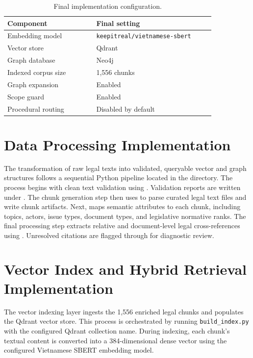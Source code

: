 \begin{table}[H]
  \centering
  \caption{Final implementation configuration.}
  \label{tab:implementation-configuration}
  \begin{tabular}{p{0.36\linewidth}p{0.48\linewidth}}
    \toprule
    Component & Final setting \\
    \midrule
    Embedding model & \texttt{keepitreal/\allowbreak{}vietnamese-sbert} \\
    Vector store & Qdrant \\
    Graph database & Neo4j \\
    Indexed corpus size & 1,556 chunks \\
    Graph expansion & Enabled \\
    Scope guard & Enabled \\
    Procedural routing & Disabled by default \\
    \bottomrule
  \end{tabular}
\end{table}

\section{Data Processing Implementation}
The transformation of raw legal texts into validated, queryable vector and graph structures follows a sequential Python pipeline located in the  directory. The process begins with clean text validation using . Validation reports are written under . The chunk generation step then uses  to parse curated legal text files and write chunk artifacts. Next,  maps semantic attributes to each chunk, including topics, actors, issue types, document types, and legislative normative ranks. The final processing step extracts relative and document-level legal cross-references using . Unresolved citations are flagged through  for diagnostic review.

\section{Vector Index and Hybrid Retrieval Implementation}
The vector indexing layer ingests the 1,556 enriched legal chunks and populates the Qdrant vector store. This process is orchestrated by running \texttt{build\_index.py} with the configured Qdrant collection name. During indexing, each chunk's textual content is converted into a 384-dimensional dense vector using the configured Vietnamese SBERT embedding model.

